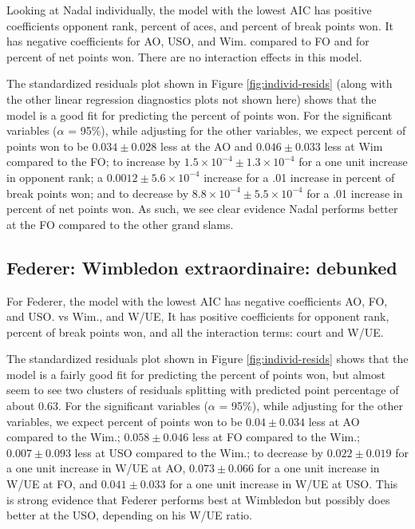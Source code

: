 \documentclass[]{article}
\begin{document}
Looking at Nadal individually, the model with the lowest AIC has
positive coefficients opponent rank, percent of aces, and percent of
break points won. It has negative coefficients for AO, USO, and Wim.
compared to FO and for percent of net points won. There are no
interaction effects in this model.

The standardized residuals plot shown in Figure \ref{fig:individ-resids}
(along with the other linear regression diagnostics plots not shown
here) shows that the model is a good fit for predicting the percent of
points won. For the significant variables (\(\alpha\) = 95\%), while
adjusting for the other variables, we expect percent of points won to be
\(0.034 \pm 0.028\) less at the AO and \(0.046 \pm 0.033\) less at Wim
compared to the FO; to increase by
\(1.5\times 10^{-4}\pm 1.3\times 10^{-4}\) for a one unit increase in
opponent rank; a \(0.0012\pm 5.6\times 10^{-4}\) increase for a .01
increase in percent of break points won; and to decrease by
\(8.8\times 10^{-4} \pm 5.5\times 10^{-4}\) for a .01 increase in
percent of net points won. As such, we see clear evidence Nadal performs
better at the FO compared to the other grand slams.

\hypertarget{federer-wimbledon-extraordinaire-debunked}{%
\subsection{Federer: Wimbledon extraordinaire:
debunked}\label{federer-wimbledon-extraordinaire-debunked}}

For Federer, the model with the lowest AIC has negative coefficients AO,
FO, and USO. vs Wim., and W/UE, It has positive coefficients for
opponent rank, percent of break points won, and all the interaction
terms: court and W/UE.

The standardized residuals plot shown in Figure \ref{fig:individ-resids}
shows that the model is a fairly good fit for predicting the percent of
points won, but almost seem to see two clusters of residuals splitting
with predicted point percentage of about 0.63. For the significant
variables (\(\alpha\) = 95\%), while adjusting for the other variables,
we expect percent of points won to be \(0.04 \pm 0.034\) less at AO
compared to the Wim.; \(0.058\pm 0.046\) less at FO compared to the
Wim.; \(0.007\pm 0.093\) less at USO compared to the Wim.; to decrease
by \(0.022 \pm 0.019\) for a one unit increase in W/UE at AO,
\(0.073 \pm 0.066\) for a one unit increase in W/UE at FO, and
\(0.041 \pm 0.033\) for a one unit increase in W/UE at USO. This is
strong evidence that Federer performs best at Wimbledon but possibly
does better at the USO, depending on his W/UE ratio.
\end{document}
